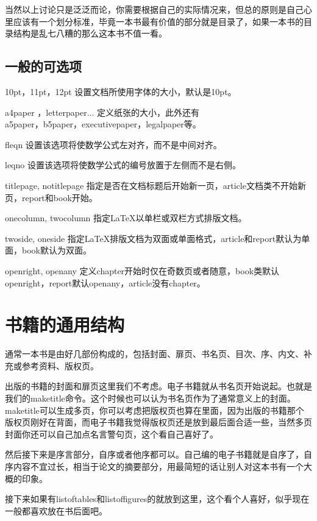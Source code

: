 \documentclass[11pt,oneside]{book}
\begin{document}
  当然以上讨论只是泛泛而论，你需要根据自己的实际情况来，但总的原则是自己心里应该有一个划分标准，毕竟一本书最有价值的部分就是目录了，如果一本书的目录结构是乱七八糟的那么这本书不值一看。

  \subsection{一般的可选项}
  10pt，11pt，12pt      设置文档所使用字体的大小，默认是10pt\cite{wikibook-latex}\linebreak 。

  a4paper ，letterpaper...      定义纸张的大小，此外还有\\a5paper，b5paper，executivepaper，legalpaper等。

  fleqn       设置该选项将使数学公式左对齐，而不是中间对齐。

  leqno       设置该选项将使数学公式的编号放置于左侧而不是右侧。

  titlepage, notitlepage       指定是否在文档标题后开始新一页，article文档类不开始新页，report和book开始。

  onecolumn, twocolumn       指定LaTeX以单栏或双栏方式排版文档。

  twoside, oneside       指定LaTeX排版文档为双面或单面格式，article和report默认为单面，book默认为双面。

  openright, openany       定义chapter开始时仅在奇数页或者随意，book类默认openright，report默认openany，article没有chapter。




  \section{书籍的通用结构}
  通常一本书是由好几部份构成的，包括封面、扉页、书名页、目次、序、内文、补充或参考资料、版权页。

  出版的书籍的封面和扉页这里我们不考虑。电子书籍就从书名页开始说起。也就是我们的maketitle命令。这个时候也可以认为书名页作为了通常意义上的封面。maketitle可以生成多页，你可以考虑把版权页也算在里面，因为出版的书籍那个版权页刚好在背面，而电子书籍我觉得版权页还是放到最后面合适一些，当然多页封面你还可以自己加点名言警句页，这个看自己喜好了。

  然后接下来是序言部分，自序或者他序都可以。自己编的电子书籍就是自序了，自序内容不宜过长，相当于论文的摘要部分，用最简短的话让别人对这本书有一个大概的印象。

  接下来如果有listoftables和listoffigures的就放到这里，这个看个人喜好，似乎现在一般都喜欢放在书后面吧。
\end{document}
